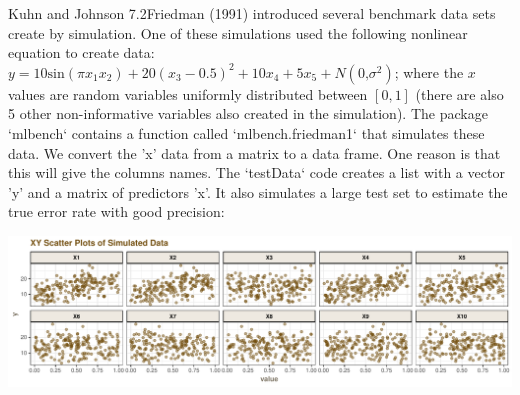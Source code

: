 \documentclass[]{report}
\newenvironment{Shaded}{\begin{snugshade}}{\end{snugshade}}
\newcommand{\KeywordTok}[1]{\textcolor[rgb]{0.13,0.29,0.53}{\textbf{#1}}}
\newcommand{\DataTypeTok}[1]{\textcolor[rgb]{0.13,0.29,0.53}{#1}}
\newcommand{\DecValTok}[1]{\textcolor[rgb]{0.00,0.00,0.81}{#1}}
\newcommand{\StringTok}[1]{\textcolor[rgb]{0.31,0.60,0.02}{#1}}
\newcommand{\OperatorTok}[1]{\textcolor[rgb]{0.81,0.36,0.00}{\textbf{#1}}}
\newcommand{\NormalTok}[1]{#1}
\begin{document}

\begin{question}{Kuhn and Johnson 7.2}Friedman (1991) introduced several benchmark data sets create by simulation. One of these simulations used the following nonlinear equation to create data: $y = 10\text{sin}(\pi x_1 x_2)+20(x_3-0.5)^2+10x_4+5x_5+N(0\text{,} \sigma^2)$; where the $x$ values are random variables uniformly distributed between $[0, 1]$ (there are also 5 other non-informative variables also created in the simulation). 
\newline
The package `mlbench` contains a function called `mlbench.friedman1` that simulates these data. We convert the 'x' data from a matrix to a data frame. One reason is that this will give the columns names. The `testData` code creates a list with a vector 'y' and a matrix of predictors 'x'. It also simulates a large test set to estimate the true error rate with good precision: \end{question}

\begin{Shaded}
\end{Shaded}

\includegraphics{AppliedPredictiveModeling_treebased_regression_files/figure-latex/kj-7.2-ex3-1.pdf}
\end{document}
